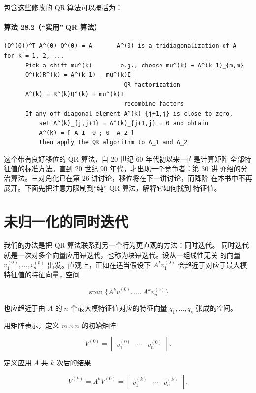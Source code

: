 \documentclass[UTF8,fontset=none,12pt]{ctexart}
\begin{document}
包含这些修改的 QR 算法可以概括为：

\paragraph{算法 28.2（“实用” QR 算法）}
\begin{verbatim}
(Q^(0))^T A^(0) Q^(0) = A       A^(0) is a tridiagonalization of A
for k = 1, 2, ...
      Pick a shift mu^(k)        e.g., choose mu^(k) = A^(k-1)_{m,m}
      Q^(k)R^(k) = A^(k-1) - mu^(k)I
                                  QR factorization
      A^(k) = R^(k)Q^(k) + mu^(k)I
                                  recombine factors
      If any off-diagonal element A^(k)_{j+1,j} is close to zero,
          set A^(k)_{j,j+1} = A^(k)_{j+1,j} = 0 and obtain
          A^(k) = [ A_1  0 ; 0  A_2 ]
          then apply the QR algorithm to A_1 and A_2
\end{verbatim}

这个带有良好移位的 QR 算法，自 20 世纪 60 年代初以来一直是计算矩阵
全部特征值的标准方法。直到 20 世纪 90 年代，才出现一个竞争者：第 30 讲
介绍的分治算法。三对角化已在第 26 讲讨论，移位将在下一讲讨论，而降阶
在本书中不再展开。下面先把注意力限制到“纯” QR 算法，解释它如何找到
特征值。

\section*{未归一化的同时迭代}

我们的办法是把 QR 算法联系到另一个行为更直观的方法：同时迭代。
同时迭代就是一次对多个向量应用幂迭代，也称为块幂迭代。设从一组线性无关
的向量 $v_1^{(0)},\ldots,v_n^{(0)}$ 出发。直观上，正如在适当假设下
$A^kv_1^{(0)}$ 会趋近于对应于最大模特征值的特征向量，空间

$$
\operatorname{span}\{A^kv_1^{(0)},\ldots,A^kv_n^{(0)}\}
$$

也应趋近于由 $A$ 的 $n$ 个最大模特征值对应的特征向量
$q_1,\ldots,q_n$ 张成的空间。

用矩阵表示，定义 $m\times n$ 的初始矩阵

\begin{equation}
 V^{(0)}=\begin{bmatrix}v_1^{(0)}&\cdots&v_n^{(0)}\end{bmatrix}.
\tag{28.1}
\end{equation}

定义应用 $A$ 共 $k$ 次后的结果

\begin{equation}
 V^{(k)}=A^kV^{(0)}
 =\begin{bmatrix}v_1^{(k)}&\cdots&v_n^{(k)}\end{bmatrix}.
\tag{28.2}
\end{equation}
\end{document}
